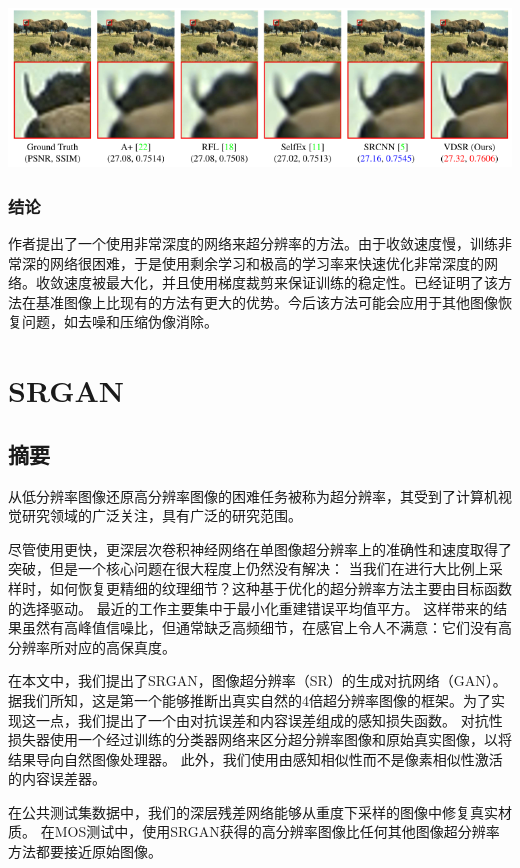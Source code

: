 \documentclass[UTF8,a4paper,10pt]{ctexrep}
\begin{document}
\includegraphics[width=\textwidth]{figure/7.png}

\subsection{结论}
作者提出了一个使用非常深度的网络来超分辨率的方法。由于收敛速度慢，训练非常深的网络很困难，于是使用剩余学习和极高的学习率来快速优化非常深度的网络。收敛速度被最大化，并且使用梯度裁剪来保证训练的稳定性。已经证明了该方法在基准图像上比现有的方法有更大的优势。今后该方法可能会应用于其他图像恢复问题，如去噪和压缩伪像消除。


\chapter{SRGAN}
\section{摘要}
从低分辨率图像还原高分辨率图像的困难任务被称为超分辨率，其受到了计算机视觉研究领域的广泛关注，具有广泛的研究范围。

尽管使用更快，更深层次卷积神经网络在单图像超分辨率上的准确性和速度取得了突破，但是一个核心问题在很大程度上仍然没有解决：
当我们在进行大比例上采样时，如何恢复更精细的纹理细节？这种基于优化的超分辨率方法主要由目标函数的选择驱动。
最近的工作主要集中于最小化重建错误平均值平方。
这样带来的结果虽然有高峰值信噪比，但通常缺乏高频细节，在感官上令人不满意：它们没有高分辨率所对应的高保真度。

在本文中，我们提出了SRGAN，图像超分辨率（SR）的生成对抗网络（GAN）。
据我们所知，这是第一个能够推断出真实自然的4倍超分辨率图像的框架。为了实现这一点，我们提出了一个由对抗误差和内容误差组成的感知损失函数。
对抗性损失器使用一个经过训练的分类器网络来区分超分辨率图像和原始真实图像，以将结果导向自然图像处理器。
此外，我们使用由感知相似性而不是像素相似性激活的内容误差器。

在公共测试集数据中，我们的深层残差网络能够从重度下采样的图像中修复真实材质。
在MOS测试中，使用SRGAN获得的高分辨率图像比任何其他图像超分辨率方法都要接近原始图像。
\end{document}
